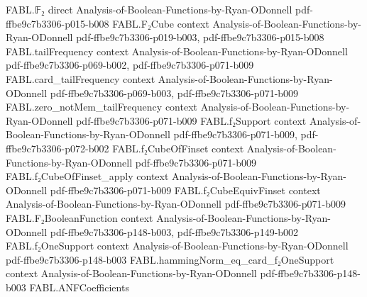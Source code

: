 \begin{theorem}
\label{FABL.two_pow_sub_le_hammingNorm_of_functionAlgebraicDegree_le}
\leanok
{}
\proofstep
  {FABL.𝔽₂}
  {direct}
  {Analysis-of-Boolean-Functions-by-Ryan-ODonnell}
  {pdf-ffbe9c7b3306-p015-b008}
\proofstep
  {FABL.F₂Cube}
  {context}
  {Analysis-of-Boolean-Functions-by-Ryan-ODonnell}
  {pdf-ffbe9c7b3306-p019-b003,
    pdf-ffbe9c7b3306-p015-b008}
\proofstep
  {FABL.tailFrequency}
  {context}
  {Analysis-of-Boolean-Functions-by-Ryan-ODonnell}
  {pdf-ffbe9c7b3306-p069-b002,
    pdf-ffbe9c7b3306-p071-b009}
\proofstep
  {FABL.card_tailFrequency}
  {context}
  {Analysis-of-Boolean-Functions-by-Ryan-ODonnell}
  {pdf-ffbe9c7b3306-p069-b003,
    pdf-ffbe9c7b3306-p071-b009}
\proofstep
  {FABL.zero_notMem_tailFrequency}
  {context}
  {Analysis-of-Boolean-Functions-by-Ryan-ODonnell}
  {pdf-ffbe9c7b3306-p071-b009}
\proofstep
  {FABL.f₂Support}
  {context}
  {Analysis-of-Boolean-Functions-by-Ryan-ODonnell}
  {pdf-ffbe9c7b3306-p071-b009,
    pdf-ffbe9c7b3306-p072-b002}
\proofstep
  {FABL.f₂CubeOfFinset}
  {context}
  {Analysis-of-Boolean-Functions-by-Ryan-ODonnell}
  {pdf-ffbe9c7b3306-p071-b009}
\proofstep
  {FABL.f₂CubeOfFinset_apply}
  {context}
  {Analysis-of-Boolean-Functions-by-Ryan-ODonnell}
  {pdf-ffbe9c7b3306-p071-b009}
\proofstep
  {FABL.f₂CubeEquivFinset}
  {context}
  {Analysis-of-Boolean-Functions-by-Ryan-ODonnell}
  {pdf-ffbe9c7b3306-p071-b009}
\proofstep
  {FABL.F₂BooleanFunction}
  {context}
  {Analysis-of-Boolean-Functions-by-Ryan-ODonnell}
  {pdf-ffbe9c7b3306-p148-b003,
    pdf-ffbe9c7b3306-p149-b002}
\proofstep
  {FABL.f₂OneSupport}
  {context}
  {Analysis-of-Boolean-Functions-by-Ryan-ODonnell}
  {pdf-ffbe9c7b3306-p148-b003}
\proofstep
  {FABL.hammingNorm_eq_card_f₂OneSupport}
  {context}
  {Analysis-of-Boolean-Functions-by-Ryan-ODonnell}
  {pdf-ffbe9c7b3306-p148-b003}
\proofstep
  {FABL.ANFCoefficients}

\end{theorem}
